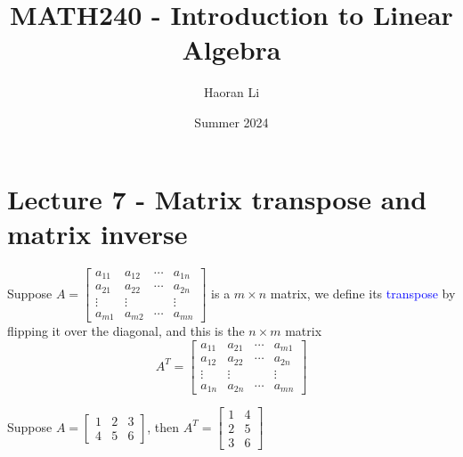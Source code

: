 \documentclass{beamer}
\title{MATH240 - Introduction to Linear Algebra}
\author{Haoran Li}
\institute[UMD]{University of Maryland, College Park}
\date{Summer 2024}
\theoremstyle{definition}
\theoremstyle{remark}
\begin{document}
\maketitle

\section{Lecture 7 - Matrix transpose and matrix inverse}

\begin{frame}[t]
\begin{definition}
Suppose $A=\begin{bmatrix}
a_{11}&a_{12}&\cdots&a_{1n}\\
a_{21}&a_{22}&\cdots&a_{2n}\\
\vdots&\vdots&&\vdots\\
a_{m1}&a_{m2}&\cdots&a_{mn}
\end{bmatrix}$ is a $m\times n$ matrix, we define its \textcolor{blue}{transpose} by flipping it over the diagonal, and this is the $n\times m$ matrix
\[
A^T=\begin{bmatrix}
a_{11}&a_{21}&\cdots&a_{m1}\\
a_{12}&a_{22}&\cdots&a_{2n}\\
\vdots&\vdots&&\vdots\\
a_{1n}&a_{2n}&\cdots&a_{mn}
\end{bmatrix}
\]
\end{definition}
\pause
\begin{example}
Suppose $A=\begin{bmatrix}
1&2&3\\4&5&6
\end{bmatrix}$, then $A^T=\begin{bmatrix}
1&4\\2&5\\3&6
\end{bmatrix}$
\end{example}
\end{frame}
\end{document}
